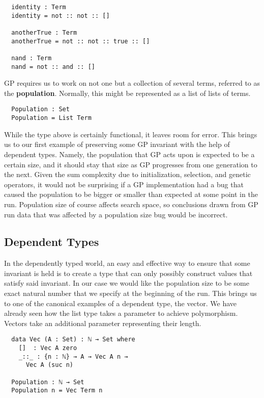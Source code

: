 \documentclass{acm_proc_article-sp}
\begin{document}
\begin{verbatim}
  identity : Term
  identity = not :: not :: []

  anotherTrue : Term
  anotherTrue = not :: not :: true :: []

  nand : Term
  nand = not :: and :: []
\end{verbatim}

GP requires us to work on not one but a collection of several terms,
referred to as the \textbf{population}. Normally, this might be
represented as a list of lists of terms.

\begin{verbatim}
  Population : Set
  Population = List Term
\end{verbatim}

While the type above is certainly functional, it leaves room for
error. This brings us to our first example of preserving some GP
invariant with the help of dependent types. Namely, the population
that GP acts upon is expected to be a certain size, and it should stay
that size as GP progresses from one generation to the next. Given the
sum complexity due to initialization, selection, and genetic
operators, it would not be surprising if a GP implementation had a bug
that caused the population to be bigger or smaller than expected
at some point in the run. Population size of course affects search
space, so conclusions drawn from GP run data that was affected by a
population size bug would be incorrect.

\subsection{Dependent Types}

In the dependently typed world, an easy and effective way to ensure
that some invariant is held is to create a type that can only possibly
construct values that satisfy said invariant. In our case we would
like the population size to be some exact natural number that we specify at the
beginning of the run. This brings us to one of the canonical examples
of a dependent type, the vector. We have already seen how the list
type takes a parameter to achieve polymorphism. Vectors take an
additional parameter representing their length.

\begin{verbatim}
  data Vec (A : Set) : ℕ → Set where
    []  : Vec A zero
    _::_ : {n : ℕ} → A → Vec A n →
      Vec A (suc n)

  Population : ℕ → Set
  Population n = Vec Term n
\end{verbatim}
\end{document}
